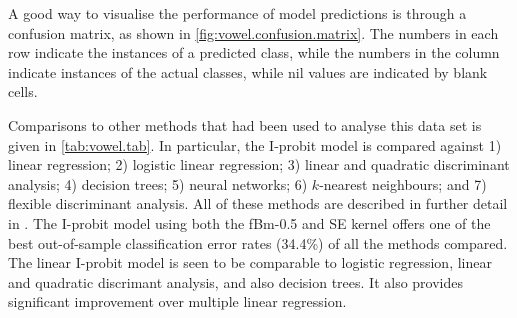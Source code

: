 \documentclass[showframe,11pt]{report}\usepackage[]{graphicx}\usepackage{xcolor}
\begin{document}
A good way to visualise the performance of model predictions is through a confusion matrix, as shown in \cref{fig:vowel.confusion.matrix}.
The numbers in each row indicate the instances of a predicted class, while the numbers in the column indicate instances of the actual classes, while nil values are indicated by blank cells.

Comparisons to other methods that had been used to analyse this data set is given in \cref{tab:vowel.tab}.
In particular, the I-probit model is compared against 1) linear regression; 2) logistic linear regression; 3) linear and quadratic discriminant analysis; 4) decision trees; 5) neural networks; 6) $k$-nearest neighbours; and 7) flexible discriminant analysis.
All of these methods are described in further detail in \citet[Chs. 4 \& 12, Table 12.3]{friedman2001elements}.
The I-probit model using both the fBm-0.5 and SE kernel offers one of the best out-of-sample classification error rates (34.4\%) of all the methods compared.
The linear I-probit model is seen to be comparable to logistic regression, linear and quadratic discrimant analysis, and also decision trees.
It also provides significant improvement over multiple linear regression.
\end{document}
